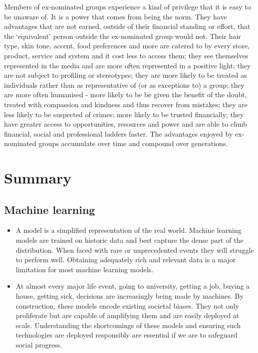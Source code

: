 Members of ex-nominated groups experience a kind of privilege that it is easy to be unaware of. It is a power that comes from being the norm. They have advantages that are not earned, outside of their financial standing or effort, that the `equivalent' person outside the ex-nominated group would not. Their hair type, skin tone, accent, food preferences and more are catered to by every store, product, service and system and it cost less to access them; they see themselves represented in the media and are more often represented in a positive light; they are not subject to profiling or stereotypes; they are more likely to be treated as individuals rather than as representative of (or as exceptions to) a group; they are more often humanised - more likely to be be given the benefit of the doubt, treated with compassion and kindness and thus recover from mistakes; they are less likely to be suspected of crimes; more likely to be trusted financially; they have greater access to opportunities, resources and power and are able to climb financial, social and professional ladders faster. The advantages enjoyed by ex-nominated groups accumulate over time and compound over generations.

\section*{Summary}

\subsection*{Machine learning}

\begin{itemize}[leftmargin=*]
\item A model is a simplified representation of the real world. Machine learning models are trained on historic data and best capture the dense part of the distribution. When faced with rare or unprecedented events they will struggle to perform well. Obtaining adequately rich and relevant data is a major limitation for most machine learning models.
%
\item At almost every major life event, going to university, getting a job, buying a house, getting sick, decisions are increasingly being made by machines. By construction, these models encode existing societal biases. They not only proliferate but are capable of amplifying them and are easily deployed at scale. Understanding the shortcomings of these models and ensuring such technologies are deployed responsibly are essential if we are to safeguard social progress.
\end{itemize}

